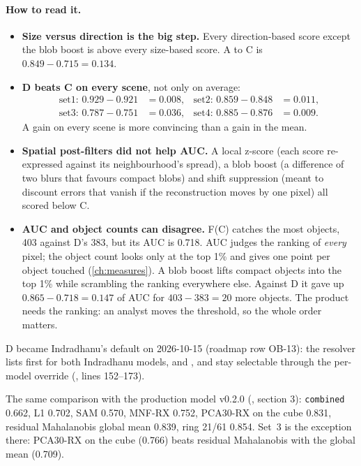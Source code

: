 \paragraph{How to read it.}
\begin{itemize}
\item \textbf{Size versus direction is the big step.} Every direction-based score except the blob boost is
  above every size-based score. A to C is $0.849-0.715=0.134$.
\item \textbf{D beats C on every scene}, not only on average:
  \begin{align*}
  \text{set1: } 0.929-0.921 &= 0.008, & \text{set2: } 0.859-0.848 &= 0.011,\\
  \text{set3: } 0.787-0.751 &= 0.036, & \text{set4: } 0.885-0.876 &= 0.009.
  \end{align*}
  A gain on every scene is more convincing than a gain in the mean.
\item \textbf{Spatial post-filters did not help AUC.} A local z-score (each score re-expressed against its
  neighbourhood's spread), a blob boost (a difference of two blurs that favours compact blobs) and shift
  suppression (meant to discount errors that vanish if the reconstruction moves by one pixel) all scored below
  C.
\item \textbf{AUC and object counts can disagree.} F(C) catches the most objects, 403 against D's 383, but its
  AUC is 0.718. AUC judges the ranking of \emph{every} pixel; the object count looks only at the top 1\% and
  gives one point per object touched (\cref{ch:measures}). A blob boost lifts compact objects into the top 1\%
  while scrambling the ranking everywhere else. Against D it gave up $0.865-0.718=0.147$ of AUC for
  $403-383=20$ more objects. The product needs the ranking: an analyst moves the threshold, so the whole order
  matters.
\end{itemize}
D became Indradhanu's default on 2026-10-15 (roadmap row OB-13): the resolver lists
 first for both Indradhanu models, and ,  and 
stay selectable through the per-model override (, lines
152--173).

\begin{drift}
The same comparison with the production model v0.2.0 (,
section 3): \texttt{combined} 0.662, L1 0.702, SAM 0.570, MNF-RX 0.752, PCA30-RX on the cube 0.831, residual
Mahalanobis global mean 0.839, ring 21/61 0.854. Set~3 is the exception there: PCA30-RX on the cube (0.766)
beats residual Mahalanobis with the global mean (0.709).
\end{drift}

